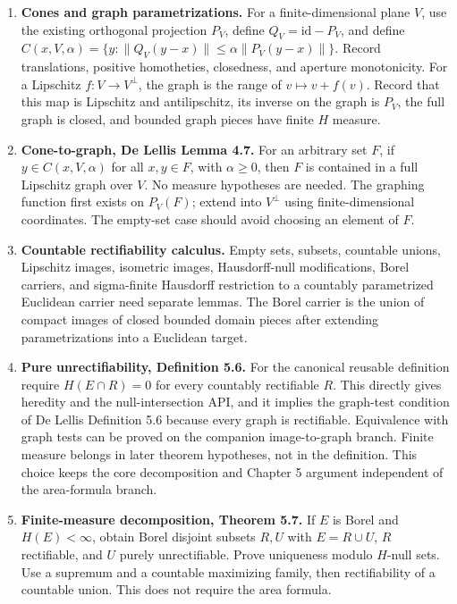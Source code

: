 \begin{enumerate}
\item \textbf{Cones and graph parametrizations.}
For a finite-dimensional plane $V$, use the existing orthogonal projection
$P_V$, define $Q_V=\mathrm{id}-P_V$, and define
$C(x,V,\alpha)=\{y:\|Q_V(y-x)\|\leq\alpha\|P_V(y-x)\|\}$.
Record translations, positive homotheties, closedness, and aperture monotonicity.
For a Lipschitz $f:V\to V^\perp$, the graph is the range of $v\mapsto v+f(v)$.
Record that this map is Lipschitz and antilipschitz, its inverse on the graph
is $P_V$, the full graph is closed, and bounded graph pieces have finite $H$ measure.

\item \textbf{Cone-to-graph, De Lellis Lemma 4.7.}
For an arbitrary set $F$, if $y\in C(x,V,\alpha)$ for all $x,y\in F$,
with $\alpha\geq0$, then $F$ is contained in a full Lipschitz graph over $V$.
No measure hypotheses are needed. The graphing function first exists on
$P_V(F)$; extend into $V^\perp$ using finite-dimensional coordinates.
The empty-set case should avoid choosing an element of $F$.

\item \textbf{Countable rectifiability calculus.}
Empty sets, subsets, countable unions, Lipschitz images, isometric images,
Hausdorff-null modifications, Borel carriers, and sigma-finite Hausdorff
restriction to a countably parametrized Euclidean carrier need separate lemmas.
The Borel carrier is the union of compact images of closed bounded domain
pieces after extending parametrizations into a Euclidean target.

\item \textbf{Pure unrectifiability, Definition 5.6.}
For the canonical reusable definition require $H(E\cap R)=0$ for every
countably rectifiable $R$. This directly gives heredity and the null-intersection
API, and it implies the graph-test condition of De Lellis Definition 5.6
because every graph is rectifiable. Equivalence with graph tests can be proved
on the companion image-to-graph branch. Finite measure belongs in later
theorem hypotheses, not in the definition. This choice keeps the core
decomposition and Chapter 5 argument independent of the area-formula branch.

\item \textbf{Finite-measure decomposition, Theorem 5.7.}
If $E$ is Borel and $H(E)<\infty$, obtain Borel disjoint subsets $R,U$ with
$E=R\cup U$, $R$ rectifiable, and $U$ purely unrectifiable. Prove uniqueness
modulo $H$-null sets. Use a supremum and a countable maximizing family, then
rectifiability of a countable union. This does not require the area formula.


\end{enumerate}
